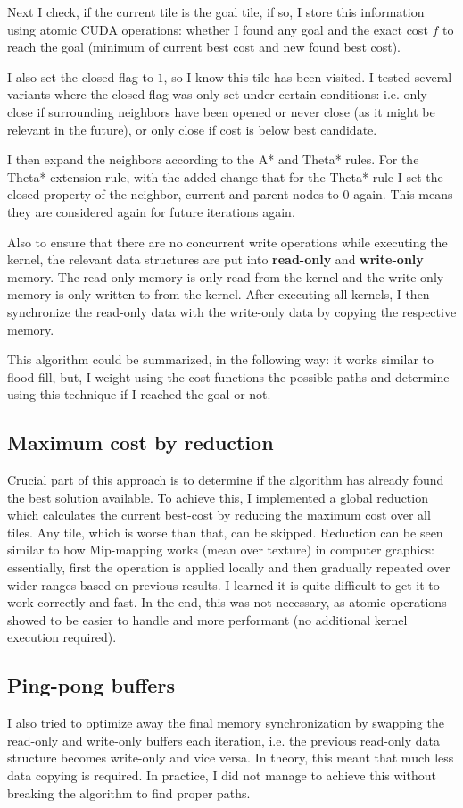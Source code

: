 \documentclass{article}
\begin{document}
Next I check, if the current tile is the goal tile, if so, I store this information using atomic CUDA operations: whether I found any goal and the exact cost $f$ to reach the goal (minimum of current best cost and new found best cost).

I also set the closed flag to $1$, so I know this tile has been visited. I tested several variants where the closed flag was only set under certain conditions: i.e. only close if surrounding neighbors have been opened or never close (as it might be relevant in the future), or only close if cost is below best candidate.

I then expand the neighbors according to the A* and Theta* rules. For the Theta* extension rule, with the added change that for the Theta* rule I set the closed property of the neighbor, current and parent nodes to $0$ again. This means they are considered again for future iterations again.

Also to ensure that there are no concurrent write operations while executing the kernel, the relevant data structures are put into \textbf{read-only} and \textbf{write-only} memory. The read-only memory is only read from the kernel and the write-only memory is only written to from the kernel. After executing all kernels, I then synchronize the read-only data with the write-only data by copying the respective memory.

This algorithm could be summarized, in the following way: it works similar to flood-fill, but, I weight using the cost-functions the possible paths and determine using this technique if I reached the goal or not.
%
\subsection{Maximum cost by reduction}
%
Crucial part of this approach is to determine if the algorithm has already found the best solution available. To achieve this, I implemented a global reduction which calculates the current best-cost by reducing the maximum cost over all tiles. Any tile, which is worse than that, can be skipped. Reduction can be seen similar to how Mip-mapping works (mean over texture) in computer graphics: essentially, first the operation is applied locally and then gradually repeated over wider ranges based on previous results. I learned it is quite difficult to get it to work correctly and fast.
%
In the end, this was not necessary, as atomic operations showed to be easier to handle and more performant (no additional kernel execution required).
%
\subsection{Ping-pong buffers}
%
I also tried to optimize away the final memory synchronization by swapping the read-only and write-only buffers each iteration, i.e. the previous read-only data structure becomes write-only and vice versa. In theory, this meant that much less data copying is required. In practice, I did not manage to achieve this without breaking the algorithm to find proper paths.
%
\end{document}

